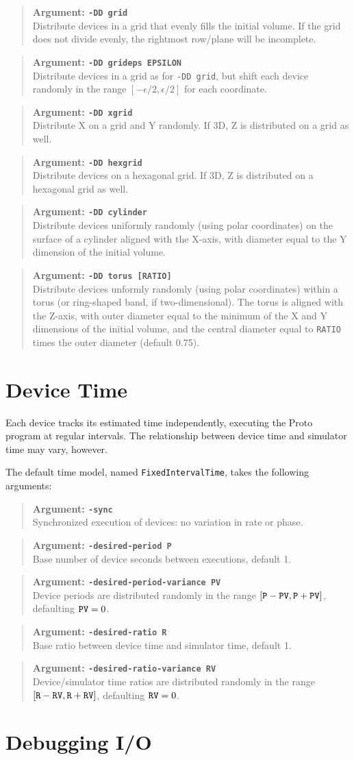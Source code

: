 \documentclass{article}
\newcommand\var[1]{{\tt #1}}
\newcommand\simarg[2]{\begin{quote} {\bf Argument: \var{#1}} \\ #2 \end{quote}}
\begin{document}
\simarg{-DD grid}{Distribute devices in a grid that evenly fills the
  initial volume.  If the grid does not divide evenly, the rightmost
  row/plane will be incomplete.}
\simarg{-DD grideps EPSILON}{Distribute devices in a grid as for
  \var{-DD grid}, but shift each device randomly in the range
  $[-\epsilon/2,\epsilon/2]$ for each coordinate.}
\simarg{-DD xgrid}{Distribute X on a grid and Y randomly.  If 3D, Z is
  distributed on a grid as well.}
\simarg{-DD hexgrid}{Distribute devices on a hexagonal grid.  If 3D, Z is
  distributed on a hexagonal grid as well.}
\simarg{-DD cylinder}{Distribute devices uniformly randomly (using polar
  coordinates) on the surface of a cylinder aligned with the X-axis,
  with diameter equal to the Y dimension of the initial volume.}
\simarg{-DD torus [RATIO]}{Distribute devices unformly randomly (using
  polar coordinates) within a torus (or ring-shaped band, if
  two-dimensional).  The torus is aligned with the Z-axis, with outer
  diameter equal to the minimum of the X and Y dimensions of the
  initial volume, and the central diameter equal to \var{RATIO} times the
  outer diameter (default 0.75).}

\section{Device Time}
\label{s:timemodel}

Each device tracks its estimated time independently, executing the
Proto program at regular intervals.  The relationship between device
time and simulator time may vary, however.

The default time model, named \var{FixedIntervalTime}, takes the
following arguments:

\simarg{-sync}{Synchronized execution of devices: no variation in rate
  or phase.}

\simarg{-desired-period P}{Base number of device seconds between
  executions, default 1.}
\simarg{-desired-period-variance PV}{Device periods are distributed randomly
  in the range $[\var{P}-\var{PV},\var{P}+\var{PV}]$, defaulting $\var{PV}=0$.}
\simarg{-desired-ratio R}{Base ratio between device time and simulator time,
  default 1.}
\simarg{-desired-ratio-variance RV}{Device/simulator time ratios are
  distributed randomly in the range
  $[\var{R}-\var{RV},\var{R}+\var{RV}]$, defaulting $\var{RV}=0$.}


\section{Debugging I/O}
\end{document}
